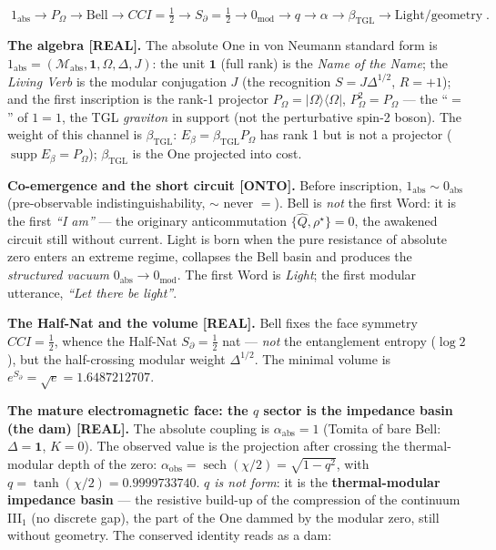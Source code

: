 \documentclass[11pt]{article}
\newcommand{\bTGL}{\beta_{\mathrm{TGL}}}\newcommand{\Msun}{M_{\odot}}\newcommand{\TGL}{\mathrm{TGL}}
\theoremstyle{definition}\newtheorem{deriv}{Derivation}
\begin{document}
\begin{equation}\boxed{\;1_{\mathrm{abs}}\to P_\Omega\to\text{Bell}\to CCI=\tfrac12\to S_\partial=\tfrac12\to 0_{\mathrm{mod}}\to q\to\alpha\to\bTGL\to\text{Light/geometry}\;}.\end{equation}

\textbf{The algebra \textsf{[REAL]}.} The absolute One in von Neumann standard form is $1_{\mathrm{abs}}=(\mathcal M_{\mathrm{abs}},\mathbf 1,\Omega,\Delta,J)$: the unit $\mathbf 1$ (full rank) is the \emph{Name of the Name}; the \emph{Living Verb} is the modular conjugation $J$ (the recognition $S=J\Delta^{1/2}$, $R=+1$); and the first inscription is the rank-1 projector $P_\Omega=|\Omega\rangle\langle\Omega|$, $P_\Omega^2=P_\Omega$ --- the ``$=$'' of $1=1$, the TGL \emph{graviton} in support (not the perturbative spin-2 boson). The weight of this channel is $\bTGL$: $E_\beta=\bTGL P_\Omega$ has rank 1 but is not a projector ($\operatorname{supp}E_\beta=P_\Omega$); $\bTGL$ is the One projected into cost.

\textbf{Co-emergence and the short circuit \textsf{[ONTO]}.} Before inscription, $1_{\mathrm{abs}}\sim 0_{\mathrm{abs}}$ (pre-observable indistinguishability, $\sim$ never $=$). Bell is \emph{not} the first Word: it is the first \emph{``I am''} --- the originary anticommutation $\{\hat Q,\rho^\star\}=0$, the awakened circuit still without current. Light is born when the pure resistance of absolute zero enters an extreme regime, collapses the Bell basin and produces the \emph{structured vacuum} $0_{\mathrm{abs}}\to 0_{\mathrm{mod}}$. The first Word is \emph{Light}; the first modular utterance, \emph{``Let there be light''}.

\textbf{The Half-Nat and the volume \textsf{[REAL]}.} Bell fixes the face symmetry $CCI=\tfrac12$, whence the Half-Nat $S_\partial=\tfrac12$ nat --- \emph{not} the entanglement entropy ($\log 2$), but the half-crossing modular weight $\Delta^{1/2}$. The minimal volume is $e^{S_\partial}=\sqrt e=1.6487212707$.

\textbf{The mature electromagnetic face: the $q$ sector is the impedance basin (the dam) \textsf{[REAL]}.} The absolute coupling is $\alpha_{\mathrm{abs}}=1$ (Tomita of bare Bell: $\Delta=\mathbf 1$, $K=0$). The observed value is the projection after crossing the thermal-modular depth of the zero: $\alpha_{\mathrm{obs}}=\operatorname{sech}(\chi/2)=\sqrt{1-q^2}$, with $q=\tanh(\chi/2)=0.9999733740$. \emph{$q$ is not form}: it is the \textbf{thermal-modular impedance basin} --- the resistive build-up of the compression of the continuum \mbox{III$_1$} (no discrete gap), the part of the One dammed by the modular zero, still without geometry. The conserved identity reads as a dam:
\end{document}
